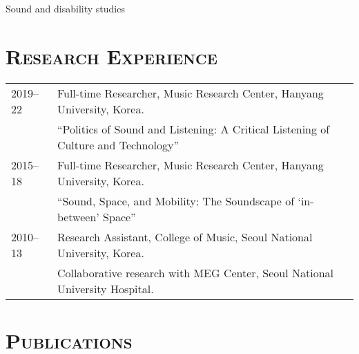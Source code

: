 \documentclass[letter,11pt,draft]{article}
\begin{document}
  \noindent \hspace{2mm} \textbullet \hspace{2mm} Sound and disability studies
  
  \section*{\textsc{Research Experience}}
  
  \hspace*{-0.25cm}
  \begin{tabular}{p{2.5cm} l}
    2019--22 & Full-time Researcher, Music Research Center, Hanyang
    University, Korea.\\
    & ``Politics of Sound and Listening: A Critical Listening of Culture and
    Technology''\\
    2015--18 & Full-time Researcher, Music Research Center, Hanyang University,
    Korea.\\
    & ``Sound, Space, and Mobility: The Soundscape of ‘in-between’ Space''\\
    2010--13 & Research Assistant, College of Music, Seoul National University,
    Korea.\\
    & Collaborative research with MEG Center, Seoul National University
    Hospital.
  \end{tabular}
  
  \vspace{2.5mm}
  
  \section*{\textsc{Publications}}
  
\end{document}

